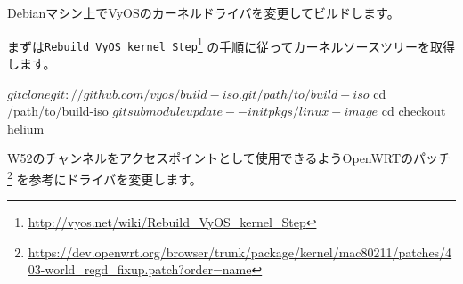 \documentclass[mingoth,a4paper]{jsarticle}
\begin{document}
Debianマシン上でVyOSのカーネルドライバを変更してビルドします。

まずは{\tt Rebuild VyOS kernel Step}\footnote{\url{http://vyos.net/wiki/Rebuild_VyOS_kernel_Step}}
の手順に従ってカーネルソースツリーを取得します。

\begin{commandline}
$ git clone git://github.com/vyos/build-iso.git /path/to/build-iso
$ cd /path/to/build-iso
$ git submodule update --init pkgs/linux-image
$ cd checkout helium
\end{commandline}

W52のチャンネルをアクセスポイントとして使用できるようOpenWRTのパッチ
\footnote{\url{https://dev.openwrt.org/browser/trunk/package/kernel/mac80211/patches/403-world_regd_fixup.patch?order=name}}
を参考にドライバを変更します。
\end{document}
